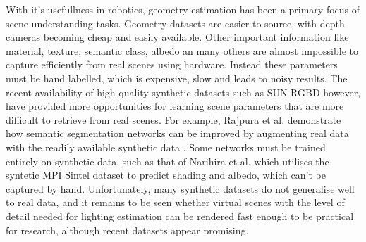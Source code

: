 \documentclass[ %
                    author={Gavin Parker},
                supervisor={Dr. Neill Campbell},
                    degree={MEng},
                     title={Deep Siamese Networks for Illumination Estimation from Stereo Images},
                  subtitle={},
                      type={research},
                      year={2018} ]{dissertation}
\begin{document}
\newline
With it's usefullness in robotics, geometry estimation has been a primary focus of scene understanding tasks. Geometry datasets are easier to source, with depth cameras becoming cheap and easily available. Other important information like material, texture, semantic class, albedo an many others are almost impossible to capture efficiently from real scenes using hardware. Instead these parameters must be hand labelled, which is expensive, slow and leads to noisy results. The recent availability of high quality synthetic datasets such as SUN-RGBD \cite{song2015sun} however, have provided more opportunities for learning scene parameters that are more difficult to retrieve from real scenes. For example, Rajpura et al. demonstrate how semantic segmentation networks can be improved by augmenting real data with the readily available synthetic data \cite{DBLP:journals/corr/abs-1709-00849}. Some networks must be trained entirely on synthetic data, such as that of Narihira et al. which utilises the syntetic MPI Sintel dataset to predict shading and albedo, which can't be captured by hand. Unfortunately, many synthetic datasets do not generalise well to real data, and it remains to be seen whether virtual scenes with the level of detail needed for lighting estimation can be rendered fast enough to be practical for research, although recent datasets appear promising.
\end{document}
